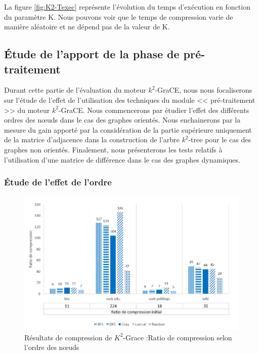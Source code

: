 La figure \ref{fig:K2-Texec} représente l'évolution du temps d'exécution en fonction du paramètre K. Nous pouvons voir que le temps de compression varie de manière aléatoire et ne dépend pas de la valeur de K.
			
			
 \subsection{Étude de l'apport de la phase de pré-traitement }
 
 Durant cette partie de l'évaluation du moteur $k^2$-GraCE, nous nous focaliserons sur l'étude de l'effet de l'utilisation des techniques du module << pré-traitement >> du moteur $k^2$-GraCE. Nous commencerons par étudier l'effet des différents ordres des nœuds dans le cas des graphes orientés. Nous enchainerons par la mesure du gain apporté par la considération de la partie supérieure uniquement de la matrice d'adjacence dans la construction de l'arbre $k^2$-tree pour le cas des graphes non orientés. Finalement, nous présenterons les tests relatifs à l'utilisation d'une matrice de différence dans le cas des graphes dynamiques.
 			
\subsubsection{Étude de l'effet de l'ordre}

\begin{figure}[H]
	\centering
	\includegraphics[scale=0.5]{ressources/image/Tests/k2-ordre.png}
	\caption{Résultats de compression de $K^2$-Grace :Ratio de compression selon l'ordre des nœuds}
	\label{fig:K2-ordre }
\end{figure}		


